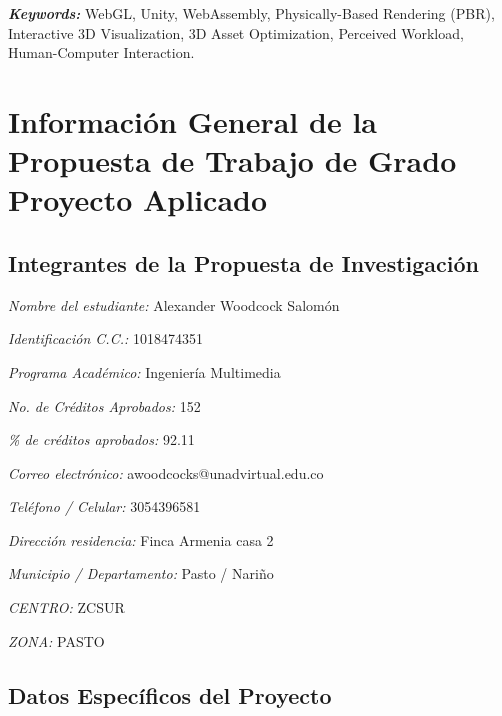 \documentclass[12pt,letterpaper]{article}
\begin{document}
\hspace{1.27cm}\textit{\textbf{Keywords:}} WebGL, Unity, WebAssembly, Physically-Based Rendering (PBR), Interactive 3D Visualization, 3D Asset Optimization, Perceived Workload, Human-Computer Interaction.

\newpage

\setlength{\parindent}{1.27cm}

\newpage
\tableofcontents
\newpage

\newpage
\renewcommand{\listtablename}{Lista de Tablas}
\listoftables
\newpage

\newpage
\section*{Informaci\'on General de la Propuesta de Trabajo de Grado Proyecto Aplicado}
{}

\subsection*{Integrantes de la Propuesta de Investigaci\'on}
{}

\textit{Nombre del estudiante:} Alexander Woodcock Salom\'on

\textit{Identificaci\'on C.C.:} 1018474351

\textit{Programa Acad\'emico:} Ingenier\'ia Multimedia

\textit{No. de Cr\'editos Aprobados:} 152

\textit{\% de cr\'editos aprobados:} 92.11

\textit{Correo electr\'onico:} awoodcocks@unadvirtual.edu.co

\textit{Tel\'efono / Celular:} 3054396581

\textit{Direcci\'on residencia:} Finca Armenia casa 2

\textit{Municipio / Departamento:} Pasto / Nari\~no

\textit{CENTRO:} ZCSUR

\textit{ZONA:} PASTO

\subsection*{Datos Espec\'ificos del Proyecto}
{}
\end{document}
